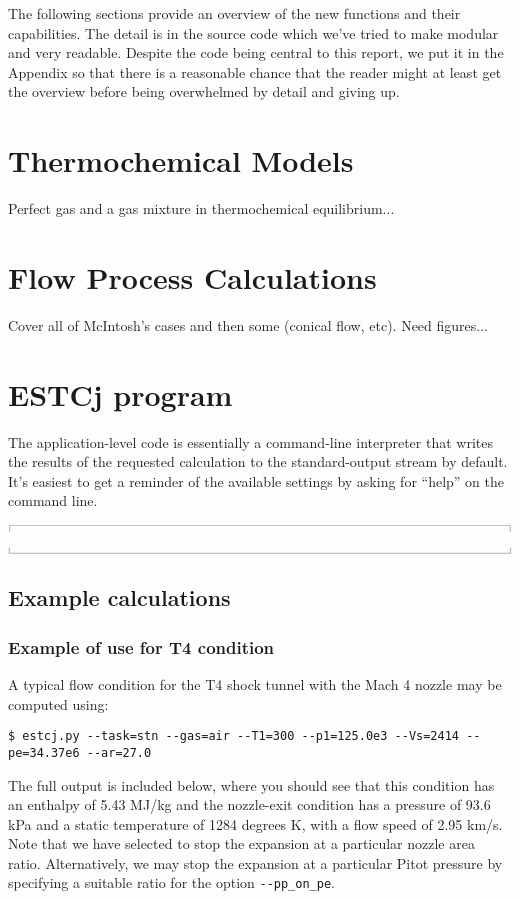\documentclass[10pt,a4paper]{article}
\newcommand{\topbar}{\ensuremath{
    \rule{0.1mm}{2.0mm} \rule[2.0mm]{159.5mm}{0.1mm} \rule{0.1mm}{2.0mm}
}}
\newcommand{\bottombar}{\ensuremath{
    \rule{0.1mm}{2.0mm} \rule{159.5mm}{0.1mm} \rule{0.1mm}{2.0mm}
}}
\begin{document}
\medskip
The following sections provide an overview of the new functions and their capabilities.
The detail is in the source code which we've tried to make modular and very readable.
Despite the code being central to this report, we put it in the Appendix so that there is
a reasonable chance that the reader might at least get the overview 
before being overwhelmed by detail and giving up.


\bigskip
\section{Thermochemical Models}
%
Perfect gas and a gas mixture in thermochemical equilibrium...

\bigskip
\section{Flow Process Calculations}
%
Cover all of McIntosh's cases and then some (conical flow, etc).
Need figures...

\bigskip
\section{ESTCj program}
%
The application-level code is essentially a command-line interpreter
that writes the results of the requested calculation to the standard-output stream
by default.
It's easiest to get a reminder of the available settings by asking for ``help''
on the command line.

\medskip
\noindent\topbar

\bottombar

\bigskip
\subsection{Example calculations}

\bigskip
\subsubsection*{Example of use for T4 condition}
%
A typical flow condition for the T4 shock tunnel
with the Mach 4 nozzle may be computed using:
\begin{verbatim}
$ estcj.py --task=stn --gas=air --T1=300 --p1=125.0e3 --Vs=2414 --pe=34.37e6 --ar=27.0
\end{verbatim}
The full output is included below, where you should see that
this condition has an enthalpy of 5.43 MJ/kg and the nozzle-exit condition
has a pressure of 93.6 kPa and a static temperature of 1284 degrees K,
with a flow speed of 2.95 km/s.
Note that we have selected to stop the expansion at a particular nozzle area ratio.
Alternatively, we may stop the expansion at a particular Pitot pressure by specifying
a suitable ratio for the option \verb?--pp_on_pe?.
\end{document}
